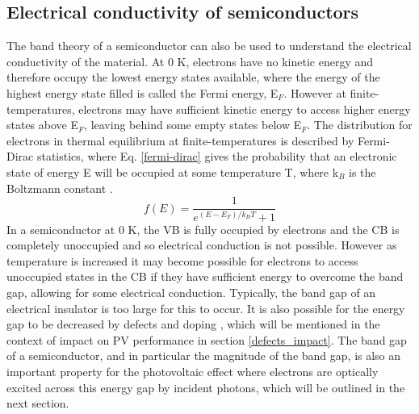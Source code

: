 \documentclass[11pt, twoside]{report}
\begin{document}
\subsection{Electrical conductivity of semiconductors}

The band theory of a semiconductor can also be used to understand the electrical conductivity of the material. At 0 K, electrons have no kinetic energy and therefore occupy the lowest energy states available, where the energy of the highest energy state filled is called the Fermi energy, E$_F$. However at finite-temperatures, electrons may have sufficient kinetic energy to access higher energy states above E$_F$, leaving behind some empty states below E$_F$. The distribution for electrons in thermal equilibrium at finite-temperatures is described by Fermi-Dirac statistics, where Eq. \ref{fermi-dirac} gives the probability that an electronic state of energy E will be occupied at some temperature T, where k$_B$ is the Boltzmann constant \cite{Nelson3}.
\begin{equation}\label{fermi-dirac}
f(E) = \frac{1}{e^{(E-E_F)/k_BT}+1}
\end{equation}
In a semiconductor at 0 K, the VB is fully occupied by electrons and the CB is completely unoccupied and so electrical conduction is not possible. However as temperature is increased it may become possible for electrons to access unoccupied states in the CB if they have sufficient energy to overcome the band gap, allowing for some electrical conduction. Typically, the band gap of an electrical insulator is too large for this to occur. It is also possible for the energy gap to be decreased by defects and doping \cite{Nelson3}, which will be mentioned in the context of impact on PV performance in section \ref{defects_impact}. The band gap of a semiconductor, and in particular the magnitude of the band gap, is also an important property for the photovoltaic effect where electrons are optically excited across this energy gap by incident photons, which will be outlined in the next section.

\end{document}
